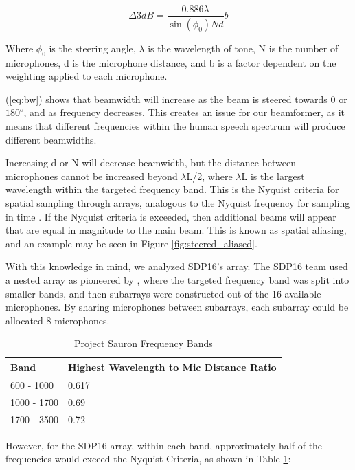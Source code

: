 \documentclass[10pt,journal,compsoc]{IEEEtran}
\begin{document}
\begin{equation} \label{eq:bw}
\Delta3dB = \frac{0.886\lambda}{\sin(\phi_0)Nd}b
\end{equation}

Where $\phi_0$ is the steering angle, $\lambda$ is the wavelength of tone, N is the number of microphones, d is the microphone distance, and b is a factor dependent on the weighting applied to each microphone.

 (\ref{eq:bw}) shows that beamwidth will increase as the beam is steered towards 0 or $180^o$, and as frequency decreases. This creates an issue for our beamformer, as it means that different frequencies within the human speech spectrum will produce different beamwidths.

Increasing d or N will decrease beamwidth, but the distance between microphones cannot be increased beyond $\lambda$L/2, where $\lambda$L is the largest wavelength within the targeted frequency band. This is the Nyquist criteria for spatial sampling through arrays, analogous to the Nyquist frequency for sampling in time \cite{sophocles}. If the Nyquist criteria is exceeded, then additional beams will appear that are equal in magnitude to the main beam. This is known as spatial aliasing, and an example may be seen in Figure \ref{fig:steered_aliased}.

With this knowledge in mind, we analyzed SDP16’s array. The SDP16 team used a nested array as pioneered by \cite{smith}, where the targeted frequency band was split into smaller bands, and then subarrays were constructed out of the 16 available microphones. By sharing microphones between subarrays, each subarray could be allocated 8 microphones.

\begin{table}[!h]
    \centering
    \begin{tabular}{|l|l|}
    \hline
    Band & Highest Wavelength to Mic Distance Ratio\\
    \hline
600 - 1000 & 0.617\\
1000 - 1700	& 0.69\\
1700 - 3500	& 0.72\\
\hline
    \end{tabular}
    \caption{Project Sauron Frequency Bands}
    \label{tab:sauron_bands}
\end{table}


However, for the SDP16 array, within each band, approximately half of the frequencies would exceed the Nyquist Criteria, as shown in Table \ref{tab:sauron_bands}:
\end{document}
